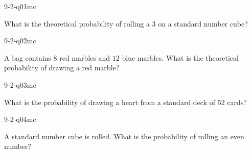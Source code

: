 

\begin{practiceQuestion}{9-2-q01}{mc}
\begin{questionText}
What is the theoretical probability of rolling a $3$ on a standard number cube?
\end{questionText}
\end{practiceQuestion}

\begin{practiceQuestion}{9-2-q02}{mc}
\begin{questionText}
A bag contains $8$ red marbles and $12$ blue marbles. What is the theoretical probability of drawing a red marble?
\end{questionText}
\end{practiceQuestion}

\begin{practiceQuestion}{9-2-q03}{mc}
\begin{questionText}
What is the probability of drawing a heart from a standard deck of $52$ cards?
\end{questionText}
\end{practiceQuestion}

\begin{practiceQuestion}{9-2-q04}{mc}
\begin{questionText}
A standard number cube is rolled. What is the probability of rolling an even number?
\end{questionText}
\end{practiceQuestion}

